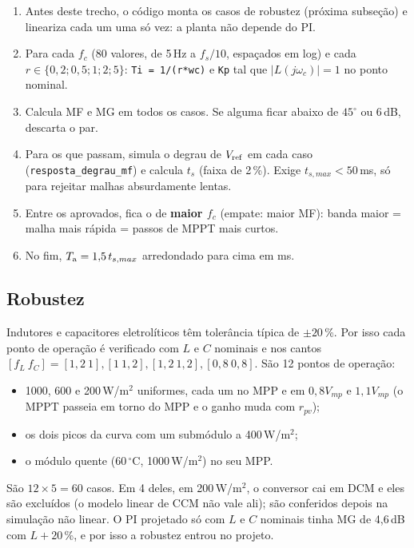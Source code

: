 
\begin{logica}
\begin{enumerate}
\item Antes deste trecho, o c\'odigo monta os casos de robustez (pr\'oxima subse\c{c}\~ao) e lineariza cada um uma s\'o vez: a planta
 n\~ao depende do PI.
\item Para cada $f_c$ (80 valores, de 5\,Hz a $f_s/10$, espa\c{c}ados em log) e cada $r\in\{0{,}2;0{,}5;1;2;5\}$:
 \texttt{Ti = 1/(r*wc)} e \texttt{Kp} tal que $|L(j\omega_c)|=1$ no ponto nominal.
\item Calcula MF e MG em todos os casos. Se alguma ficar abaixo de $45^\circ$ ou 6\,dB, descarta o par.
\item Para os que passam, simula o degrau de $V_{\mathrm{ref}}$ em cada caso (\texttt{resposta\_degrau\_mf}) e calcula $t_s$ (faixa de 2\,\%).
 Exige $t_{s,max}<50$\,ms, s\'o para rejeitar malhas absurdamente lentas.
\item Entre os aprovados, fica o de \textbf{maior $f_c$} (empate: maior MF): banda maior = malha mais r\'apida = passos de MPPT mais curtos.
\item No fim, $T_{\mathrm{a}}=1{,}5\,t_{s,max}$ arredondado para cima em ms.
\end{enumerate}
\end{logica}

\subsection{Robustez}

Indutores e capacitores eletrol\'iticos t\^em toler\^ancia t\'ipica de $\pm20$\,\%. Por isso cada ponto de opera\c{c}\~ao \'e
verificado com $L$ e $C$ nominais e nos cantos $[f_L\ f_C]=[1{,}2\ 1],[1\ 1{,}2],[1{,}2\ 1{,}2],[0{,}8\ 0{,}8]$. S\~ao 12 pontos de
opera\c{c}\~ao:
\begin{itemize}
\item 1000, 600 e 200\,W/m$^2$ uniformes, cada um no MPP e em $0{,}8V_{mp}$ e $1{,}1V_{mp}$ (o MPPT passeia em torno do MPP e o ganho muda com $r_{pv}$);
\item os dois picos da curva com um subm\'odulo a 400\,W/m$^2$;
\item o m\'odulo quente (60\,$^\circ$C, 1000\,W/m$^2$) no seu MPP.
\end{itemize}
S\~ao $12\times5=60$ casos. Em 4 deles, em 200\,W/m$^2$, o conversor cai em DCM e eles s\~ao exclu\'idos (o modelo linear de CCM
n\~ao vale ali); s\~ao conferidos depois na simula\c{c}\~ao n\~ao linear. O PI projetado s\'o com $L$ e $C$ nominais tinha MG de 4,6\,dB
com $L+20$\,\%, e por isso a robustez entrou no projeto.

